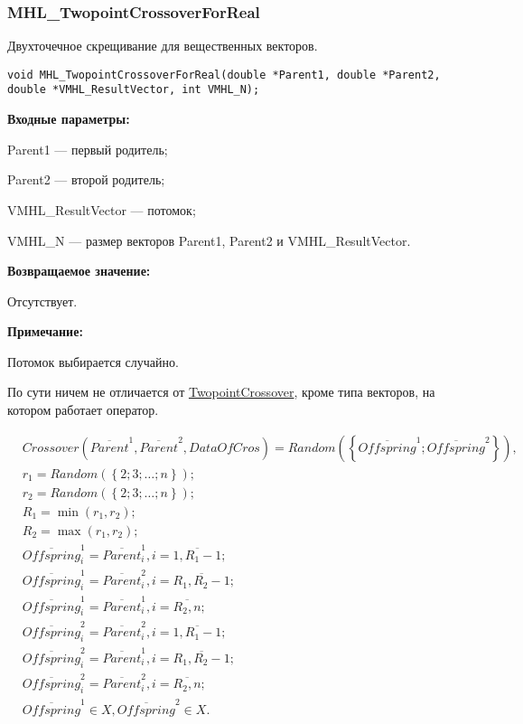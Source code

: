 \documentclass[a4paper,12pt]{article}
\begin{document}
\subsubsection{MHL\_TwopointCrossoverForReal}\label{MHL_TwopointCrossoverForReal}

Двухточечное скрещивание для вещественных векторов.


\begin{lstlisting}[label=code_syntax_MHL_TwopointCrossoverForReal,caption=Синтаксис]
void MHL_TwopointCrossoverForReal(double *Parent1, double *Parent2, double *VMHL_ResultVector, int VMHL_N);
\end{lstlisting}

\textbf{Входные параметры:}
 
 Parent1 --- первый родитель;
 
 Parent2 --- второй родитель;
 
 VMHL\_ResultVector --- потомок;
 
 VMHL\_N --- размер векторов Parent1, Parent2 и VMHL\_ResultVector.

\textbf{Возвращаемое значение:}

 Отсутствует.
 
\textbf{ Примечание:}

 Потомок выбирается случайно.
 
По сути ничем не отличается от \hyperref[SetOfOperatorsAlgorithms:TwopointCrossover]{TwopointCrossover}, кроме типа векторов, на котором работает оператор.
 
\begin{align}
&Crossover \left( \overline{Parent}^1, \overline{Parent}^2, DataOfCros\right)=Random \left(\left\lbrace \overline{Offspring}^1; \overline{Offspring}^2\right\rbrace  \right),\nonumber \\
&r_1=Random\left( \left\lbrace 2; 3; \ldots; n\right\rbrace \right); \nonumber \\
&r_2=Random\left( \left\lbrace 2; 3; \ldots; n\right\rbrace \right); \nonumber \\
&R_1=\min \left( r_1, r_2\right) ; \nonumber \\
&R_2=\max \left( r_1, r_2\right) ; \nonumber \\
& \overline{Offspring}^1_i=\overline{Parent}^1_i, i=\overline{1,R_1-1};\nonumber\\
& \overline{Offspring}^1_i=\overline{Parent}^2_i, i=\overline{R_1,R_2-1};\nonumber\\
&  \overline{Offspring}^1_i=\overline{Parent}^1_i, i=\overline{R_2,n};\nonumber\\
& \overline{Offspring}^2_i=\overline{Parent}^2_i, i=\overline{1,R_1-1};\nonumber\\
& \overline{Offspring}^2_i=\overline{Parent}^1_i, i=\overline{R_1,R_2-1};\nonumber\\
&  \overline{Offspring}^2_i=\overline{Parent}^2_i, i=\overline{R_2,n};\nonumber\\
&\overline{Offspring}^1\in X, \overline{Offspring}^2\in X.
\end{align}
\end{document}
